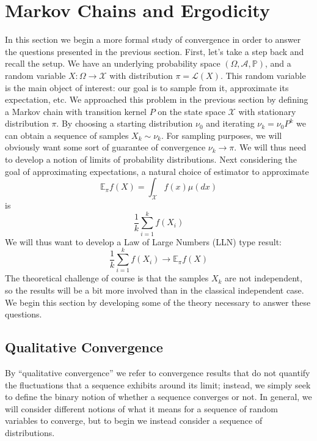 \documentclass[12pt]{article}
\newcommand{\E}{\mathbb{E}}
\newcommand{\Prob}{\mathbb{P}}
\begin{document}
\section{Markov Chains and Ergodicity}
In this section we begin a more formal study of convergence in order to answer the questions presented in the previous section. First, let's take a step 
back and recall the setup. We have an underlying probability space $(\Omega, \mathcal{A}, \Prob)$, and a random variable $X: \Omega \to \mathcal{X}$
with distribution $\pi = \mathcal{L}(X)$. This random variable is the main object of interest: our goal is to sample from it, approximate its expectation, 
etc. We approached this problem in the previous section by defining a Markov chain with transition kernel $P$ on the state space $\mathcal{X}$ with stationary distribution 
$\pi$. By choosing a starting distribution $\nu_0$ and iterating $\nu_k = \nu_0 P^k$ we can obtain a sequence of samples $X_k \sim \nu_k$. For sampling purposes, 
we will obviously want some sort of guarantee of convergence $\nu_k \to \pi$. We will thus need to develop a notion of limits of probability distributions. 
Next considering the goal of 
approximating expectations, a natural choice of estimator to approximate
\[\E_\pi f(X) = \int_{\mathcal{X}} f(x) \mu(dx)\]
is 
\[\frac{1}{k} \sum_{i = 1}^{k} f(X_i)\]
We will thus want to develop a Law of Large Numbers (LLN) type result: 
\[\frac{1}{k} \sum_{i = 1}^{k} f(X_i) \to \E_\pi f(X)\]
The theoretical challenge of course is that the samples $X_k$ are not independent, so the results will be a bit more involved than in the classical independent 
case. We begin this section by developing some of the theory necessary to answer these questions. 

\subsection{Qualitative Convergence}
By ``qualitative convergence'' we refer to convergence results that do not quantify the fluctuations that a sequence exhibits around its limit; instead, we simply
seek to define the binary notion of whether a sequence converges or not. In general, we will consider different notions of what it means for a sequence of random 
variables to converge, but to begin we instead consider a sequence of distributions. 
\end{document}
